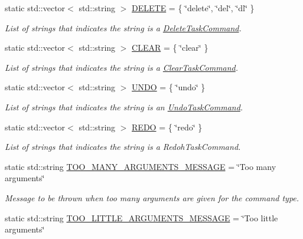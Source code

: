 \begin{DoxyCompactItemize}
static std\+::vector$<$ std\+::string $>$ \hyperlink{class_do_lah_1_1_command_parser_a205ebad6759a659219ed0a0decff7c2e}{D\+E\+L\+E\+T\+E} = \{ \char`\"{}delete\char`\"{}, \char`\"{}del\char`\"{}, \char`\"{}dl\char`\"{} \}
\begin{DoxyCompactList}\small\item\em List of strings that indicates the string is a \hyperlink{class_do_lah_1_1_delete_task_command}{Delete\+Task\+Command}. \end{DoxyCompactList}\item 
static std\+::vector$<$ std\+::string $>$ \hyperlink{class_do_lah_1_1_command_parser_a78a083731453c88a2684e788b516a84f}{C\+L\+E\+A\+R} = \{ \char`\"{}clear\char`\"{} \}
\begin{DoxyCompactList}\small\item\em List of strings that indicates the string is a \hyperlink{class_do_lah_1_1_clear_task_command}{Clear\+Task\+Command}. \end{DoxyCompactList}\item 
static std\+::vector$<$ std\+::string $>$ \hyperlink{class_do_lah_1_1_command_parser_a45a95546b7799a8107e53b2f9b06b832}{U\+N\+D\+O} = \{ \char`\"{}undo\char`\"{} \}
\begin{DoxyCompactList}\small\item\em List of strings that indicates the string is an \hyperlink{class_do_lah_1_1_undo_task_command}{Undo\+Task\+Command}. \end{DoxyCompactList}\item 
static std\+::vector$<$ std\+::string $>$ \hyperlink{class_do_lah_1_1_command_parser_a947bf7899fda03c33aced5b1458bc00e}{R\+E\+D\+O} = \{ \char`\"{}redo\char`\"{} \}
\begin{DoxyCompactList}\small\item\em List of strings that indicates the string is a Redoh\+Task\+Command. \end{DoxyCompactList}\item 
static std\+::string \hyperlink{class_do_lah_1_1_command_parser_aacc0440f95ccf0e54114d2aa7dd0938e}{T\+O\+O\+\_\+\+M\+A\+N\+Y\+\_\+\+A\+R\+G\+U\+M\+E\+N\+T\+S\+\_\+\+M\+E\+S\+S\+A\+G\+E} = \char`\"{}Too many arguments\char`\"{}
\begin{DoxyCompactList}\small\item\em Message to be thrown when too many arguments are given for the command type. \end{DoxyCompactList}\item 
static std\+::string \hyperlink{class_do_lah_1_1_command_parser_a3c16426a9f69f4a7553baf90267f0a35}{T\+O\+O\+\_\+\+L\+I\+T\+T\+L\+E\+\_\+\+A\+R\+G\+U\+M\+E\+N\+T\+S\+\_\+\+M\+E\+S\+S\+A\+G\+E} = \char`\"{}Too little arguments\char`\"{}

\end{DoxyCompactItemize}
